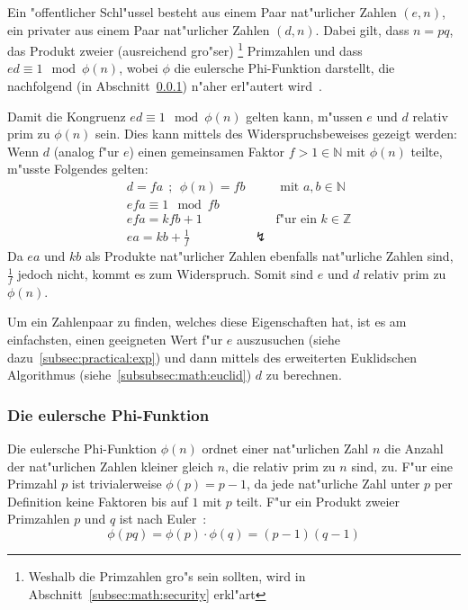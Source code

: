 \documentclass[12pt]{article}
\begin{document}
Ein "offentlicher Schl"ussel besteht aus einem Paar nat"urlicher Zahlen $(e, n)$,
ein privater aus einem Paar nat"urlicher Zahlen $(d, n)$.
Dabei gilt, dass $n = pq$, das Produkt zweier (ausreichend gro"ser)%
\footnote{Weshalb die Primzahlen gro"s sein sollten, wird in Abschnitt~\ref{subsec:math:security} erkl"art}
Primzahlen und dass $ed \equiv 1 \mod \phi(n)$,
wobei $\phi$ die eulersche Phi-Funktion darstellt, die nachfolgend
(in Abschnitt~\ref{subsubsec:math:keys:phi}) n"aher erl"autert wird~\cite{rsa}.

Damit die Kongruenz $ed \equiv 1 \mod \phi(n)$ gelten kann, m"ussen $e$ und $d$ relativ prim zu $\phi(n)$ sein.
Dies kann mittels des Widerspruchsbeweises gezeigt werden:
Wenn $d$ (analog f"ur $e$) einen gemeinsamen Faktor $f > 1 \in \mathbb{N}$ mit $\phi(n)$ teilte, m"usste Folgendes gelten:
\begin{equation}
\label{eq:ed_prime_phi_n}
\begin{aligned}
&d = fa ~~;~~ \phi(n) = fb && \textrm{ mit } a, b \in \mathbb{N} \\
&efa \equiv 1 \mod fb \\
&efa = kfb + 1 && \textrm{f"ur ein } k \in \mathbb{Z} \\
&ea = kb + \frac{1}{f} & \lightning &
\end{aligned}
\end{equation}
Da $ea$ und $kb$ als Produkte nat"urlicher Zahlen ebenfalls nat"urliche Zahlen sind, $\frac{1}{f}$ jedoch nicht, kommt es zum Widerspruch.
Somit sind $e$ und $d$ relativ prim zu $\phi(n)$.

Um ein Zahlenpaar zu finden, welches diese Eigenschaften hat,
ist es am einfachsten, einen geeigneten Wert f"ur $e$ auszusuchen (siehe dazu~\ref{subsec:practical:exp})
und dann mittels des erweiterten Euklidschen Algorithmus (siehe~\ref{subsubsec:math:euclid}) $d$ zu berechnen.

\subsubsection{Die eulersche Phi-Funktion}
\label{subsubsec:math:keys:phi}
Die eulersche Phi-Funktion $\phi(n)$ ordnet einer nat"urlichen Zahl $n$ die Anzahl
der nat"urlichen Zahlen kleiner gleich $n$, die relativ prim zu $n$ sind, zu.
F"ur eine Primzahl $p$ ist trivialerweise $\phi(p) = p-1$,
da jede nat"urliche Zahl unter $p$ per Definition keine Faktoren bis auf $1$ mit $p$ teilt.
F"ur ein Produkt zweier Primzahlen $p$ und $q$ ist nach Euler~\cite{euler63}:
\begin{equation}\label{eq:phi_calc}\phi(pq) = \phi(p) \cdot \phi(q) = (p-1)(q-1)\end{equation}
\end{document}
